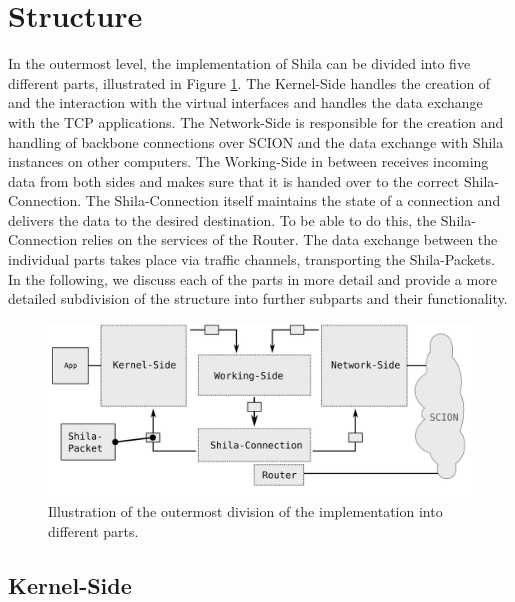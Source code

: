 \newpage
\section{Structure}
\label{sec:ImplementationStructure}

In the outermost level, the implementation of Shila can be divided into five different parts, illustrated in Figure \ref{fig:ImplementationModulesOutermost}. The Kernel-Side handles the creation of and the interaction with the virtual interfaces and handles the data exchange with the TCP applications. The Network-Side is responsible for the creation and handling of backbone connections over SCION and the data exchange with Shila instances on other computers. The Working-Side in between receives incoming data from both sides and makes sure that it is handed over to the correct Shila-Connection. The Shila-Connection itself maintains the state of a connection and delivers the data to the desired destination. To be able to do this, the Shila-Connection relies on the services of the Router.  The data exchange between the individual parts takes place via traffic channels, transporting the Shila-Packets. In the following, we discuss each of the parts in more detail and provide a more detailed subdivision of the structure into further subparts and their functionality.  

\begin{figure}[H]
	\begin{center}
		\def\svgwidth{1\textwidth}
		\includegraphics[scale=0.2]{../illustrations/implementation/ModulesOutermost.pdf}   
		\caption[Caption for the list of figures.]{Illustration of the outermost division of the implementation into different parts.}
		\label{fig:ImplementationModulesOutermost}
	\end{center}
\end{figure}

\subsection{Kernel-Side}

